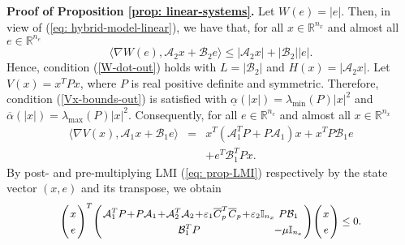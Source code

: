 \documentclass[a4paper, 9pt, twocolumn]{IEEEtran}
\theoremstyle{plain}
\theoremstyle{definition}
\newcommand{\R}[2]{\ensuremath{\mathbb{R}^{#1}_{#2}}}
\begin{document}
\vspace{0.5cm}
\noindent \textbf{Proof of Proposition \ref{prop: linear-systems}.}
Let $W(e) = |e|$. Then, in view of (\ref{eq: hybrid-model-linear}), we have that, for all $x \in \R{n_{x}}{}$ and almost all $e \in \R{n_{e}}{}$
\begin{equation}
  \langle\nabla W(e), \mathcal{A}_{2}x + \mathcal{B}_{2}e\rangle \leq |\mathcal{A}_{2}x| + |\mathcal{B}_{2}||e|.
\end{equation}
Hence, condition (\ref{W-dot-out}) holds with $L = |\mathcal{B}_{2}|$ and $H(x) = |\mathcal{A}_{2}x|$. Let $V(x) = x^{T}Px$, where $P$ is real positive definite and symmetric. Therefore, condition (\ref{Vx-bounds-out}) is satisfied with $\underline{\alpha}(|x|) = \lambda_{\min}(P)|x|^{2}$ and $\overline{\alpha}(|x|) = \lambda_{\max}(P)|x|^{2}$. Consequently, for all $e \in \R{n_{e}}{}$ and almost all $x \in \R{n_{x}}{}$
\begin{equation} \label{vx-dot}
\begin{array}{lcl}
  \langle\nabla V(x), \mathcal{A}_{1}x + \mathcal{B}_{1}e\rangle &=& x^{T}(\mathcal{A}_{1}^{T}P + P\mathcal{A}_{1})x + x^{T}P\mathcal{B}_{1}e \\[2pt]
                                                        & &+ e^{T}\mathcal{B}_{1}^{T}Px.
\end{array}
\end{equation}
By post- and pre-multiplying LMI (\ref{eq: prop-LMI}) respectively by the state vector $(x,e)$ and its transpose, we obtain
\begin{equation}\small
\arraycolsep=1pt\def\arraystretch{1.3}
\begin{array}{rrrrr}
  \left(\begin{array}{c} x \\ e \end{array}\right)^{T}\!\left(\begin{array}{cc} \mathcal{A}_{1}^{T}P\!+\! P\mathcal{A}_{1}\!  + \! \mathcal{A}_{2}^{T}\mathcal{A}_{2}\! + \!\varepsilon_{1}\overline{C}_{p}^{T}\overline{C}_{p} \! + \!\varepsilon_{2}\mathbb{I}_{n_{x}} \!&\!P\mathcal{B}_{1} \\ \mathcal{B}_{1}^{T}P\!&\!-\mu\mathbb{I}_{n_{e}} \end{array}\right)\!\left(\begin{array}{c} x \\ e \end{array}\right) \leq 0.
\end{array}
\end{equation}
\end{document}
